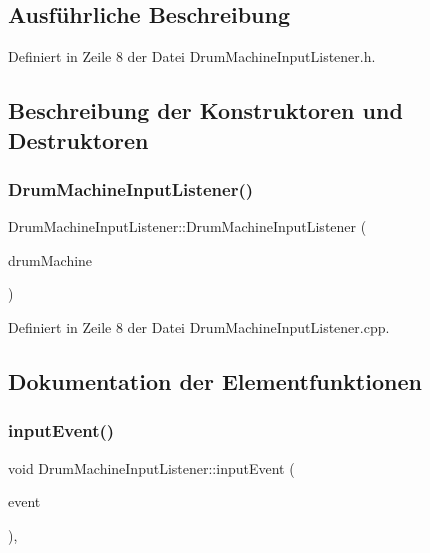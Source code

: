 \subsection{Ausführliche Beschreibung}


Definiert in Zeile 8 der Datei Drum\+Machine\+Input\+Listener.\+h.



\subsection{Beschreibung der Konstruktoren und Destruktoren}
\mbox{\label{class_drum_machine_input_listener_a7552c36ebae9e6ae49f8929ae9853354}} 
\subsubsection{\texorpdfstring{Drum\+Machine\+Input\+Listener()}{DrumMachineInputListener()}}
{\footnotesize\ttfamily Drum\+Machine\+Input\+Listener\+::\+Drum\+Machine\+Input\+Listener (\begin{DoxyParamCaption}\item[{\hyperlink{class_drum_machine}{Drum\+Machine} \&}]{drum\+Machine }\end{DoxyParamCaption})\hspace{0.3cm}{\ttfamily [explicit]}}



Definiert in Zeile 8 der Datei Drum\+Machine\+Input\+Listener.\+cpp.



\subsection{Dokumentation der Elementfunktionen}
\mbox{\label{class_drum_machine_input_listener_a44a620b09b35885a26befe84fa6e1ab0}} 
\subsubsection{\texorpdfstring{input\+Event()}{inputEvent()}}
{\footnotesize\ttfamily void Drum\+Machine\+Input\+Listener\+::input\+Event (\begin{DoxyParamCaption}\item[{unsigned short}]{event }\end{DoxyParamCaption})\hspace{0.3cm}{\ttfamily [override]}, {\ttfamily [virtual]}}



